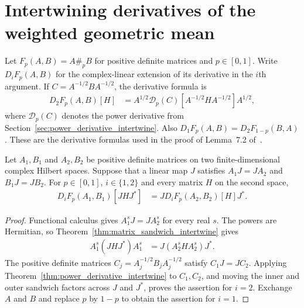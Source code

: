 \section{Intertwining derivatives of the weighted geometric mean}
\label{sec:geometric_mean_derivative_intertwine}

Let $F_p(A,B)=A\#_p B$ for positive definite matrices and $p\in[0,1]$.
Write $D_iF_p(A,B)$ for the complex-linear extension of its derivative
in the $i$th argument. If $C=A^{-1/2}BA^{-1/2}$, the derivative formula is
\begin{align*}
  D_2F_p(A,B)[H]
    &=A^{1/2}\mathcal D_p(C)[A^{-1/2}HA^{-1/2}]A^{1/2},
\end{align*}
where $\mathcal D_p(C)$ denotes the power derivative from
Section~\ref{sec:power_derivative_intertwine}.
Also $D_1F_p(A,B)=D_2F_{1-p}(B,A)$.
These are the derivative formulas used in the proof of
Lemma~7.2 of~\cite{OpenAI2026AreaLaw}.

\begin{theorem}
  \label{thm:geometric_mean_derivative_intertwine}
  \leanok
  Let $A_1,B_1$ and $A_2,B_2$ be positive definite matrices on two
  finite-dimensional complex Hilbert spaces. Suppose that a linear map $J$
  satisfies $A_1J=JA_2$ and $B_1J=JB_2$.
  For $p\in[0,1]$, $i\in\{1,2\}$ and every matrix $H$ on the second space,
  \begin{align*}
    D_iF_p(A_1,B_1)[JHJ^*]
      &=J D_iF_p(A_2,B_2)[H]J^*.
  \end{align*}
\end{theorem}

\begin{proof}
  \leanok
  Functional calculus gives $A_1^sJ=JA_2^s$ for every real $s$.
  The powers are Hermitian, so
  Theorem~\ref{thm:matrix_sandwich_intertwine} gives
  \begin{align*}
    A_1^s(JHJ^*)A_1^s&=J(A_2^sHA_2^s)J^*.
  \end{align*}
  The positive definite matrices $C_j=A_j^{-1/2}B_jA_j^{-1/2}$
  satisfy $C_1J=JC_2$. Applying
  Theorem~\ref{thm:power_derivative_intertwine} to $C_1,C_2$,
  and moving the inner and outer sandwich factors across $J$ and $J^*$,
  proves the assertion for $i=2$. Exchange $A$ and $B$ and replace $p$ by
  $1-p$ to obtain the assertion for $i=1$.
\end{proof}

